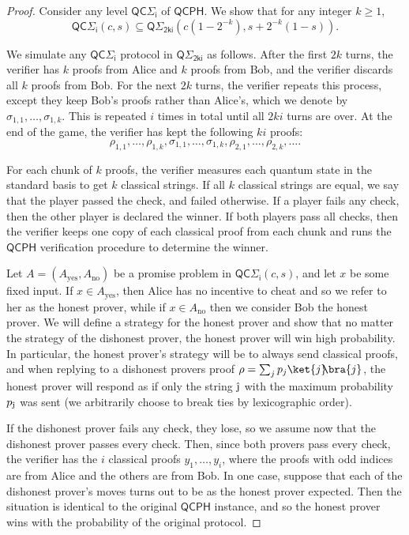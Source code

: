 \documentclass[10pt,a4paper]{article}
\theoremstyle{definition}
\newcommand{\yes}{\text{yes}}
\newcommand{\no}{\text{no}}
\newcommand{\class}[1]{\ensuremath{\mathsf{#1}}\xspace}
\newcommand{\QCPH}{\class{QCPH}}
\newcommand{\QCSigmai}[1][i]{\class{QC\Sigma_{#1}}}
\newcommand{\QSigmai}[1][i]{\class{Q\Sigma_{#1}}}
\begin{document}
\begin{proof}
    Consider any level $\QCSigmai$ of $\QCPH$. 
    We show that for any integer $k\geq 1$, 
    \begin{equation}\label{eqn:QCinQPH}
        \QCSigmai(c,s) \subseteq \QSigmai[2ki]\left(c\left(1-2^{-k}\right),s + 2^{-k}\left(1 - s\right)\right).
    \end{equation} 

    We simulate any $\QCSigmai$ protocol in $\QSigmai[2ki]$ as follows. 
    After the first $2k$ turns, the verifier has $k$ proofs from Alice and $k$ proofs from Bob, and the verifier discards all $k$ proofs from Bob.
    For the next $2k$ turns, the verifier repeats this process, except they keep Bob's proofs rather than Alice's, which we denote by $\sigma_{1,1},\dots, \sigma_{1,k}$.
    This is repeated $i$ times in total until all $2ki$ turns are over. At the end of the game, the verifier has kept the following $ki$ proofs:
    \[
    \rho_{1,1},\dots, \rho_{1,k}, \sigma_{1,1}, \dots, \sigma_{1,k}, \rho_{2,1},\dots, \rho_{2,k}, \dots .
    \]
    
    For each chunk of $k$ proofs, the verifier measures each quantum state in the standard basis to get $k$ classical strings. If all $k$ classical strings are equal, we say that the player passed the check, and failed otherwise.  
    If a player fails any check, then the other player is declared the winner.
    If both players pass all checks, then the verifier keeps one copy of each classical proof from each chunk and runs the $\QCPH$ verification procedure to determine the winner. 

    Let $A = (A_\yes, A_\no)$ be a promise problem in $\QCSigmai(c,s)$, and let $x$ be some fixed input. 
    If $x \in A_\yes$, then Alice has no incentive to cheat and so we refer to her as the honest prover, while if $x \in A_\no$ then we consider Bob the honest prover.
    We will define a strategy for the honest prover and show that no matter the strategy of the dishonest prover, the honest prover will win high probability. 
    In particular, the honest prover's strategy will be to always send classical proofs, and when replying to a dishonest provers proof $\rho = \sum_j p_j \ket{j}\!\!\bra{j}$, the honest prover will respond as if only the string $\hat{\text{\j}}$ with the maximum probability $p_{\hat{\text{\j}}}$ was sent (we arbitrarily choose to break ties by lexicographic order).


    If the dishonest prover fails any check, they lose, so we assume now that the dishonest prover passes every check.
    Then, since both provers pass every check, the verifier has the $i$ classical proofs $y_1, \dots, y_i$, where the proofs with odd indices are from Alice and the others are from Bob. 
    In one case, suppose that each of the dishonest prover's moves turns out to be as the honest prover expected. 
    Then the situation is identical to the original $\QCPH$ instance, and so the honest prover wins with the probability of the original protocol. 
    

\end{proof}
\end{document}
